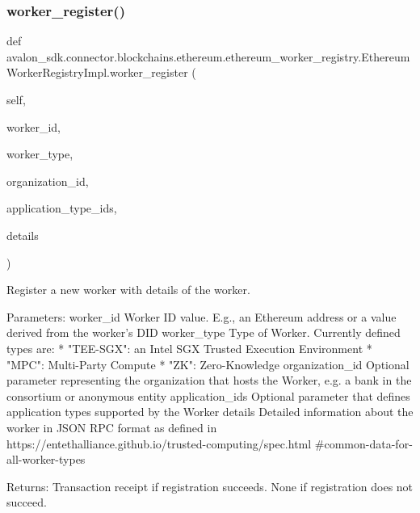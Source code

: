 \subsubsection{\texorpdfstring{worker\+\_\+register()}{worker\_register()}}
{\footnotesize\ttfamily def avalon\+\_\+sdk.\+connector.\+blockchains.\+ethereum.\+ethereum\+\_\+worker\+\_\+registry.\+Ethereum\+Worker\+Registry\+Impl.\+worker\+\_\+register (\begin{DoxyParamCaption}\item[{}]{self,  }\item[{}]{worker\+\_\+id,  }\item[{}]{worker\+\_\+type,  }\item[{}]{organization\+\_\+id,  }\item[{}]{application\+\_\+type\+\_\+ids,  }\item[{}]{details }\end{DoxyParamCaption})}

\begin{DoxyVerb}Register a new worker with details of the worker.

Parameters:
worker_id       Worker ID value. E.g., an Ethereum address or
        a value derived from the worker's DID
worker_type     Type of Worker. Currently defined types are:
        * "TEE-SGX": an Intel SGX Trusted Execution
          Environment
        * "MPC": Multi-Party Compute
        * "ZK": Zero-Knowledge
organization_id Optional parameter representing the
        organization that hosts the Worker,
        e.g. a bank in the consortium or
        anonymous entity
application_ids Optional parameter that defines
        application types supported by the Worker
details         Detailed information about the worker in
        JSON RPC format as defined in
https://entethalliance.github.io/trusted-computing/spec.html
#common-data-for-all-worker-types

Returns:
Transaction receipt if registration succeeds.
None if registration does not succeed.
\end{DoxyVerb}
 \mbox{\label{classavalon__sdk_1_1connector_1_1blockchains_1_1ethereum_1_1ethereum__worker__registry_1_1EthereumWorkerRegistryImpl_ab220c1d0eaad1251422eabd0d5e77012}} 
